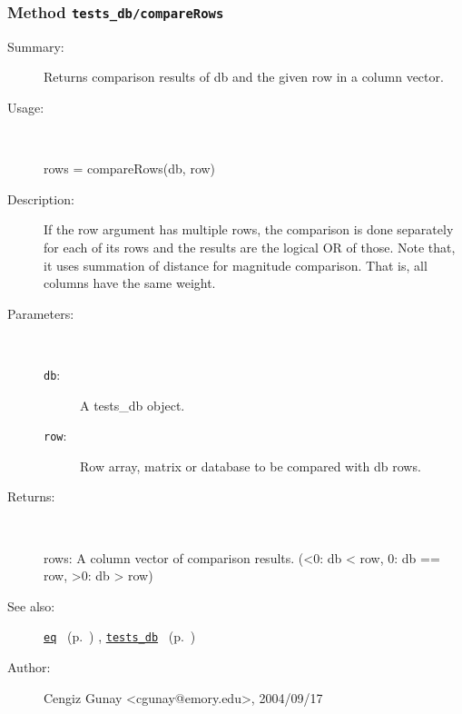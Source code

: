 \subsubsection[Method \texttt{compareRows}]{Method \texttt{tests\_db/compareRows}}%
%
\label{ref_tests_db__compareRows}%
\hypertarget{ref_tests_db__compareRows}{}%
\begin{description}
\item[Summary:]Returns comparison results of db and the given row in a column vector.
%
\item[Usage:]~%
\begin{lyxcode}%
rows = compareRows(db, row)
%
\end{lyxcode}%
%
\item[Description:]%
If the row argument has multiple rows, the comparison is done separately
 for each of its rows and the results are the logical OR of those.
 Note that, it uses summation of distance for magnitude comparison. 
 That is, all columns have the same weight.
\item[Parameters:]~
\begin{description}%
\item[\texttt{db}:]
 A tests\_db object.
\item[\texttt{row}:]
 Row array, matrix or database to be compared with db rows.
\end{description}%
%
\item[Returns:]~

	rows: A column vector of comparison results. 
		(<0: db < row, 0: db == row, >0: db > row)
%
%
\item[See also:]%
\hyperlink{ref_eq}{\texttt{eq}}%
\ (p.~\pageref{ref_eq})%
%
, \hyperlink{ref_tests_db}{\texttt{tests\_db}}%
\ (p.~\pageref{ref_tests_db})%
%
%
\item[Author:]%
Cengiz Gunay <cgunay@emory.edu>, 2004/09/17%
\end{description}
\methodline%
